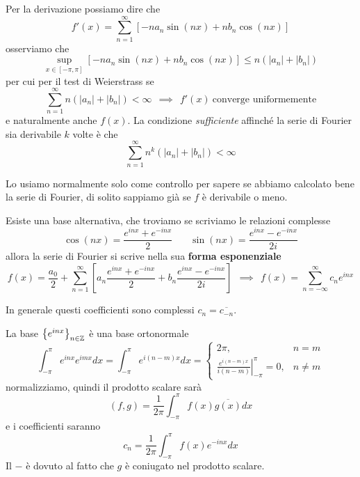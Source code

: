 \begin{thm}
[Derivazione]
Per la derivazione possiamo dire che
\begin{equation*}
f'(x) = \sum\limits^{\infty}_{n = 1}[- na_{n}\sin(nx) + nb_{n}\cos(nx)]
\end{equation*}
osserviamo che
\begin{equation*}
\sup_{x\in [- \pi, \pi]}[- na_{n}\sin(nx) + nb_{n}\cos(nx)] \leq n(| a_{n}| + | b_{n}|)
\end{equation*}
per cui per il test di Weierstrass se
\begin{equation*}
\sum\limits^{\infty}_{n = 1} n(| a_{n}| + | b_{n}|) < \infty \ \ \implies \ \ f'(x) \ \text{converge uniformemente}
\end{equation*}
e naturalmente anche $f(x)$. La condizione \textit{sufficiente} affinché la serie di Fourier sia derivabile $k$ volte è che
\begin{equation*}
\sum\limits^{\infty}_{n = 1} n^{k}(| a_{n}| + | b_{n}|) < \infty
\end{equation*}
\end{thm}
\begin{rem}
Lo usiamo normalmente solo come controllo per sapere se abbiamo calcolato bene la serie di Fourier, di solito sappiamo già se $f$ è derivabile o meno.
\end{rem}
Esiste una base alternativa, che troviamo se scriviamo le relazioni complesse
\begin{equation*}
\cos(nx) = \frac{e^{inx} + e^{- inx}}{2} \ \ \ \ \ \ \ \ \sin(nx) = \frac{e^{inx} - e^{- inx}}{2i}
\end{equation*}
allora la serie di Fourier si scrive nella sua \textbf{forma esponenziale}
\begin{equation*}
f(x) = \frac{a_{0}}{2} + \sum\limits^{\infty}_{n = 1}\left[a_{n}\frac{e^{inx} + e^{- inx}}{2} + b_{n}\frac{e^{inx} - e^{- inx}}{2i}\right] \ \ \implies \ \ \boxed{f(x) = \sum\limits^{\infty}_{n = - \infty} c_{n} e^{inx}}
\end{equation*}
\begin{rem}
In generale questi coefficienti sono complessi $c_{n} = \overline{c_{- n}}$.
\end{rem}
\begin{rem}
La base $\left\{e^{inx}\right\}_{n\in \mathbb{Z}}$ è una base ortonormale
\begin{equation*}
\int^{\pi}_{- \pi} e^{inx} e^{imx} dx = \int^{\pi}_{- \pi} e^{i(n - m) x} dx =
\begin{cases}
2\pi, & n = m\\
\left. \frac{e^{i(n - m) x}}{i(n - m)}\right|^{\pi}_{- \pi} = 0, & n\neq m
\end{cases}
\end{equation*}
normalizziamo, quindi il prodotto scalare sarà
\begin{equation*}
(f, g) = \frac{1}{2\pi}\int^{\pi}_{- \pi} f(x)\overline{g(x)} dx
\end{equation*}
e i coefficienti saranno
\begin{equation*}
c_{n} = \frac{1}{2\pi}\int^{\pi}_{- \pi} f(x) e^{- inx} dx
\end{equation*}
Il $ - $ è dovuto al fatto che $g$ è coniugato nel prodotto scalare.
\end{rem}


